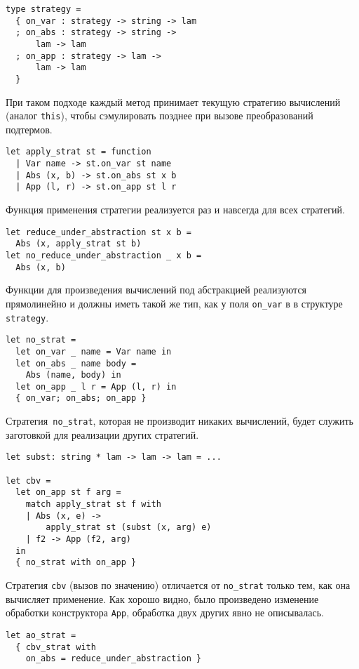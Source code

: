 \begin{lstlisting}
type strategy = 
  { on_var : strategy -> string -> lam 
  ; on_abs : strategy -> string -> 
      lam -> lam 
  ; on_app : strategy -> lam -> 
      lam -> lam 
  }
\end{lstlisting}

При таком подходе каждый метод принимает  текущую стратегию вычислений (аналог \texttt{this}), чтобы сэмулировать позднее при вызове преобразований подтермов.
\begin{lstlisting}
let apply_strat st = function
  | Var name -> st.on_var st name
  | Abs (x, b) -> st.on_abs st x b
  | App (l, r) -> st.on_app st l r
\end{lstlisting}
Функция применения стратегии реализуется раз и навсегда для всех стратегий.

\begin{lstlisting}
let reduce_under_abstraction st x b =
  Abs (x, apply_strat st b)
let no_reduce_under_abstraction _ x b = 
  Abs (x, b)
\end{lstlisting}

Функции для произведения вычислений под абстракцией реализуются прямолинейно и должны иметь такой же тип, как у поля \lstinline{on_var} в в структуре \lstinline{strategy}.

\begin{lstlisting}
let no_strat =
  let on_var _ name = Var name in
  let on_abs _ name body = 
    Abs (name, body) in
  let on_app _ l r = App (l, r) in
  { on_var; on_abs; on_app }
\end{lstlisting}
Стратегия~\lstinline{no_strat}, которая не производит никаких вычислений, будет служить заготовкой для реализации других стратегий.

\begin{lstlisting}
let subst: string * lam -> lam -> lam = ...

let cbv =
  let on_app st f arg =
    match apply_strat st f with
    | Abs (x, e) -> 
        apply_strat st (subst (x, arg) e)
    | f2 -> App (f2, arg)
  in
  { no_strat with on_app }
\end{lstlisting}


Стратегия \lstinline{cbv} (вызов по значению) отличается от \lstinline{no_strat} только тем, как она вычисляет применение. Как хорошо видно, было произведено изменение обработки конструктора \lstinline{App}, обработка двух других явно не описывалась.

\begin{lstlisting}
let ao_strat =
  { cbv_strat with 
    on_abs = reduce_under_abstraction }
\end{lstlisting}


